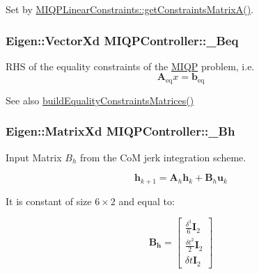 \-Set by \hyperlink{classMIQPLinearConstraints_ab556e990dcc0b1fcd152f41a8c00e1f6}{\-M\-I\-Q\-P\-Linear\-Constraints\-::get\-Constraints\-Matrix\-A()}. \hypertarget{classMIQPController_a59bee510bcc945ad2267a82ec2116d79}{
\subsubsection[{\-\_\-\-Beq}]{\setlength{\rightskip}{0pt plus 5cm}\-Eigen\-::\-Vector\-Xd {\bf \-M\-I\-Q\-P\-Controller\-::\-\_\-\-Beq}}}\label{classMIQPController_a59bee510bcc945ad2267a82ec2116d79}
\-R\-H\-S of the equality constraints of the \hyperlink{namespaceMIQP}{\-M\-I\-Q\-P} problem, i.\-e. \[ \mathbf{A}_{\text{eq}} x = \mathbf{b}_{\text{eq}} \]

\begin{DoxySeeAlso}{\-See also}
\hyperlink{classMIQPController_a870c7d3c0e5fcfd46f7bb95924007082}{build\-Equality\-Constraints\-Matrices()} 
\end{DoxySeeAlso}
\hypertarget{classMIQPController_a9a989875871a898f0ad19b441a2c67ba}{
\subsubsection[{\-\_\-\-Bh}]{\setlength{\rightskip}{0pt plus 5cm}\-Eigen\-::\-Matrix\-Xd {\bf \-M\-I\-Q\-P\-Controller\-::\-\_\-\-Bh}}}\label{classMIQPController_a9a989875871a898f0ad19b441a2c67ba}
\-Input \-Matrix $B_h$ from the \-Co\-M jerk integration scheme.

\[ \mathbf{h}_{k+1} = \mathbf{A}_h \mathbf{h}_k + \mathbf{B}_h \mathbf{u}_k \]

\-It is constant of size $6\times2$ and equal to\-:

\[ \mathbf{B_h} = \left[ \begin{array}{c} \frac{\delta^3}{6}\mathbf{I}_2 \\ \frac{\delta t^2}{2} \mathbf{I}_2 \\ \delta t \mathbf{I}_2 \end{array} \right] \]

